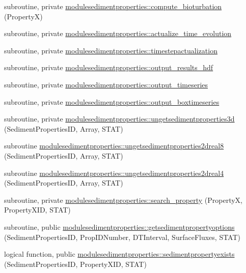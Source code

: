 \begin{DoxyCompactItemize}
subroutine, private \mbox{\hyperlink{namespacemodulesedimentproperties_ae53733a5fdfd90feccc3a7f557e05cc9}{modulesedimentproperties\+::compute\+\_\+bioturbation}} (PropertyX)
\item 
subroutine, private \mbox{\hyperlink{namespacemodulesedimentproperties_a6cedd3db0fa694031e6d17f2ef9d7eb9}{modulesedimentproperties\+::actualize\+\_\+time\+\_\+evolution}}
\item 
subroutine, private \mbox{\hyperlink{namespacemodulesedimentproperties_a9bc2949e84269f97fba7dd6633e221d9}{modulesedimentproperties\+::timestepactualization}}
\item 
subroutine, private \mbox{\hyperlink{namespacemodulesedimentproperties_adcdacad517c08441d00e6cb73a5bff47}{modulesedimentproperties\+::output\+\_\+results\+\_\+hdf}}
\item 
subroutine, private \mbox{\hyperlink{namespacemodulesedimentproperties_a45f67a80f9c968c6138d9eeef961a523}{modulesedimentproperties\+::output\+\_\+timeseries}}
\item 
subroutine, private \mbox{\hyperlink{namespacemodulesedimentproperties_a3a4760ed6e653fdd099e8fe327ae428e}{modulesedimentproperties\+::output\+\_\+boxtimeseries}}
\item 
subroutine, private \mbox{\hyperlink{namespacemodulesedimentproperties_aee146c5fb6ec7343cd2af683f76043b9}{modulesedimentproperties\+::ungetsedimentproperties3d}} (Sediment\+Properties\+ID, Array, S\+T\+AT)
\item 
subroutine \mbox{\hyperlink{namespacemodulesedimentproperties_a1403cdef2dd5dd1114fbe5112f6e064b}{modulesedimentproperties\+::ungetsedimentproperties2dreal8}} (Sediment\+Properties\+ID, Array, S\+T\+AT)
\item 
subroutine \mbox{\hyperlink{namespacemodulesedimentproperties_accb6adda15d2ee5cad20ff3f45586c73}{modulesedimentproperties\+::ungetsedimentproperties2dreal4}} (Sediment\+Properties\+ID, Array, S\+T\+AT)
\item 
subroutine, private \mbox{\hyperlink{namespacemodulesedimentproperties_a30718f70ea81a445eb986292b5c9cd5f}{modulesedimentproperties\+::search\+\_\+property}} (PropertyX, Property\+X\+ID, S\+T\+AT)
\item 
subroutine, public \mbox{\hyperlink{namespacemodulesedimentproperties_a140a456cc243156f2a6bc2d18fc0a834}{modulesedimentproperties\+::getsedimentpropertyoptions}} (Sediment\+Properties\+ID, Prop\+I\+D\+Number, D\+T\+Interval, Surface\+Fluxes, S\+T\+AT)
\item 
logical function, public \mbox{\hyperlink{namespacemodulesedimentproperties_a5b50162eeb042d1b89c4fc2ed2edfa45}{modulesedimentproperties\+::sedimentpropertyexists}} (Sediment\+Properties\+ID, Property\+X\+ID, S\+T\+AT)

\end{DoxyCompactItemize}
